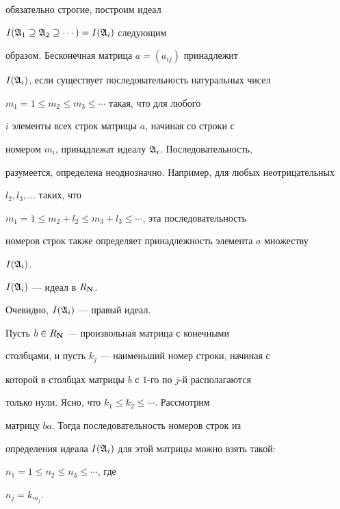 обязательно строгие, построим идеал


$I(\frak A_1 \supseteq \frak A_2 \supseteq \dotsb)=I(\frak A_i)$ следующим


образом. Бесконечная матрица $a=(a_{ij})$ принадлежит


$I(\frak A_i)$, если существует последовательность натуральных чисел


$ m_1=1 \le m_2 \le m_3 \le \dotsb$ такая, что для любого


$i$ элементы всех строк матрицы $a$, начиная со строки с


номером $m_i$, принадлежат идеалу $\frak A_i$. Последовательность,


разумеется, определена неоднозначно. Например, для любых неотрицательных


$l_2,l_3,\dotsc$ таких, что


$m_1=1 \le m_2+l_2 \le m_3+l_3 \le \dotsb$, эта последовательность


номеров строк также определяет принадлежность элемента $a$ множеству


$I(\frak A_i)$.





\begin{lem}


$I(\frak A_i)$ --- идеал в $R_{\bold N}$.


\end{lem}





\begin{pf} Очевидно, $I(\frak A_i)$ --- правый идеал.


Пусть $b \in R_{\bold N}$ --- произвольная матрица с конечными


столбцами, и пусть $k_j$ --- наименьший номер строки, начиная с


которой в столбцах матрицы $b$ с $1$-го по $j$-й располагаются


только нули. Ясно, что $k_1 \le k_2 \le \dotsb$. Рассмотрим


матрицу $ba$. Тогда последовательность номеров строк из


определения идеала $I(\frak A_i)$ для этой матрицы можно взять такой:


$n_1=1 \le n_2 \le n_3 \le \dotsb$, где


$n_j=k_{m_j}$.


\end{pf}





